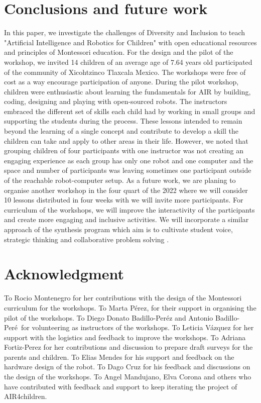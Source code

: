 \documentclass[conference]{IEEEtran}
\begin{document}
\section{Conclusions and future work}
In this paper, we investigate the challenges of Diversity and Inclusion to teach "Artificial Intelligence and Robotics for Children" with open educational resources and principles of Montessori education. 
For the design and the pilot of the workshop, we invited 14 children of an average age of 7.64 years old participated of the community of Xicohtzinco Tlaxcala Mexico.
The workshops were free of cost as a way encourage participation of anyone. 
During the pilot workshop, children were enthusiastic about learning the fundamentals for AIR by building, coding, designing and playing with open-sourced robots. The instructors embraced the different set of skills each child had by working in small groups and supporting the students during the process. These lessons intended to remain beyond the learning of a single concept and contribute to develop a skill the children can take and apply to other areas in their life.
However, we noted that grouping children of four participants with one instructor was not creating an engaging experience as each group has only one robot and one computer and the space and number of participants was leaving sometimes one participant outside of the reachable robot-computer setup.
As a future work, we are planing to organise another workshop in the four quart of the 2022 where we will consider 10 lessons distributed in four weeks with we will invite more participants.
For curriculum of the workshops, we will improve the interactivity of the participants and create more engaging and inclusive activities. We will incorporate a similar approach of the synthesis program which aim is to cultivate student voice, strategic thinking and collaborative problem solving \cite{synthesis2022}.



\section*{Acknowledgment}
To Rocio Montenegro for her contributions with the design of the Montessori curriculum for the workshops.
To Marta P\'erez, for their support in organising the pilot of the workshops.
To Diego Donato Badillo-Per\'ez and Antonio Badillo-Per\'e\ for volunteering as instructors of the workshops.
To Leticia V\'azquez for her support with the logistics and feedback to improve the workshops.
To Adriana Fortiz-Perez for her contributions and discussion to prepare draft surveys for the parents and children. 
To Elias Mendes for his support and feedback on the hardware design of the robot.
To Dago Cruz for his feedback and discussions on the design of the workshops.
To Angel Mandujano, Elva Corona and others who have contributed with feedback and support to keep iterating the project of AIR4children. 
\end{document}
